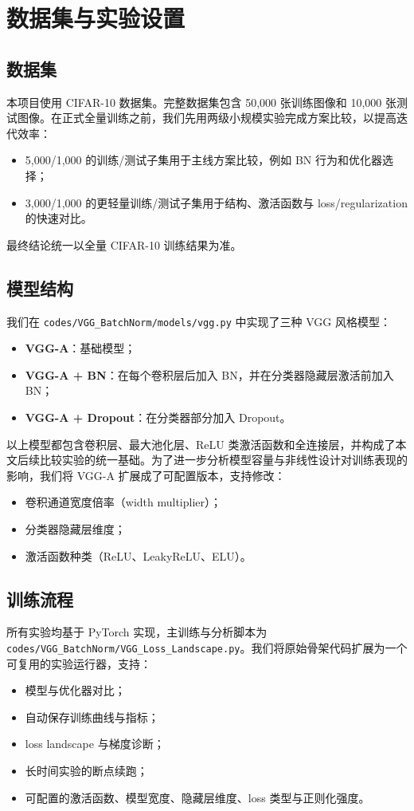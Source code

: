 \documentclass[11pt]{article}
\begin{document}
\section{数据集与实验设置}
\subsection{数据集}
本项目使用 CIFAR-10 数据集。完整数据集包含 50,000 张训练图像和 10,000 张测试图像。在正式全量训练之前，我们先用两级小规模实验完成方案比较，以提高迭代效率：
\begin{itemize}
    \item 5,000/1,000 的训练/测试子集用于主线方案比较，例如 BN 行为和优化器选择；
    \item 3,000/1,000 的更轻量训练/测试子集用于结构、激活函数与 loss/regularization 的快速对比。
\end{itemize}
最终结论统一以全量 CIFAR-10 训练结果为准。

\subsection{模型结构}
我们在 \texttt{codes/VGG\_BatchNorm/models/vgg.py} 中实现了三种 VGG 风格模型：
\begin{itemize}
    \item \textbf{VGG-A}：基础模型；
    \item \textbf{VGG-A + BN}：在每个卷积层后加入 BN，并在分类器隐藏层激活前加入 BN；
    \item \textbf{VGG-A + Dropout}：在分类器部分加入 Dropout。
\end{itemize}

以上模型都包含卷积层、最大池化层、ReLU 类激活函数和全连接层，并构成了本文后续比较实验的统一基础。为了进一步分析模型容量与非线性设计对训练表现的影响，我们将 VGG-A 扩展成了可配置版本，支持修改：
\begin{itemize}
    \item 卷积通道宽度倍率（width multiplier）；
    \item 分类器隐藏层维度；
    \item 激活函数种类（ReLU、LeakyReLU、ELU）。
\end{itemize}

\subsection{训练流程}
所有实验均基于 PyTorch 实现，主训练与分析脚本为 \texttt{codes/VGG\_BatchNorm/VGG\_Loss\_Landscape.py}。我们将原始骨架代码扩展为一个可复用的实验运行器，支持：
\begin{itemize}
    \item 模型与优化器对比；
    \item 自动保存训练曲线与指标；
    \item loss landscape 与梯度诊断；
    \item 长时间实验的断点续跑；
    \item 可配置的激活函数、模型宽度、隐藏层维度、loss 类型与正则化强度。
\end{itemize}
\end{document}
